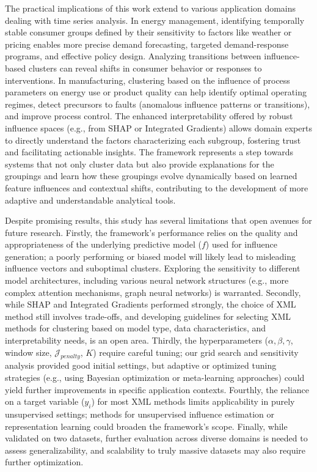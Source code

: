 \documentclass[final,authoryear,3p,times,review,sort&compress]{elsarticle}
\begin{document}
The practical implications of this work extend to various application domains dealing with time series analysis. In energy management, identifying temporally stable consumer groups defined by their sensitivity to factors like weather or pricing enables more precise demand forecasting, targeted demand-response programs, and effective policy design. Analyzing transitions between influence-based clusters can reveal shifts in consumer behavior or responses to interventions. In manufacturing, clustering based on the influence of process parameters on energy use or product quality can help identify optimal operating regimes, detect precursors to faults (anomalous influence patterns or transitions), and improve process control. The enhanced interpretability offered by robust influence spaces (e.g., from SHAP or Integrated Gradients) allows domain experts to directly understand the factors characterizing each subgroup, fostering trust and facilitating actionable insights. The framework represents a step towards systems that not only cluster data but also provide explanations for the groupings and learn how these groupings evolve dynamically based on learned feature influences and contextual shifts, contributing to the development of more adaptive and understandable analytical tools.

Despite promising results, this study has several limitations that open avenues for future research. Firstly, the framework's performance relies on the quality and appropriateness of the underlying predictive model ($f$) used for influence generation; a poorly performing or biased model will likely lead to misleading influence vectors and suboptimal clusters. Exploring the sensitivity to different model architectures, including various neural network structures (e.g., more complex attention mechanisms, graph neural networks) is warranted. Secondly, while SHAP and Integrated Gradients performed strongly, the choice of XML method still involves trade-offs, and developing guidelines for selecting XML methods for clustering based on model type, data characteristics, and interpretability needs, is an open area. Thirdly, the hyperparameters ($\alpha, \beta, \gamma$, window size, $\mathcal{J}_{penalty}$, $K$) require careful tuning; our grid search and sensitivity analysis provided good initial settings, but adaptive or optimized tuning strategies (e.g., using Bayesian optimization or meta-learning approaches) could yield further improvements in specific application contexts. Fourthly, the reliance on a target variable ($y_i$) for most XML methods limits applicability in purely unsupervised settings; methods for unsupervised influence estimation or representation learning could broaden the framework's scope. Finally, while validated on two datasets, further evaluation across diverse domains is needed to assess generalizability, and scalability to truly massive datasets may also require further optimization.
\end{document}
